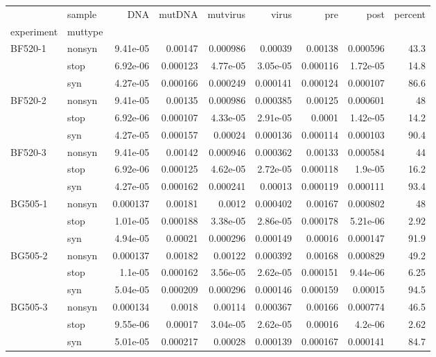 {\small
\begin{tabular}{llrrrrrrr}
\toprule
        & sample &      DNA &   mutDNA &  mutvirus &    virus &      pre &     post &  percent \\
experiment & muttype &          &          &           &          &          &          &          \\
\midrule
BF520-1 & nonsyn & 9.41e-05 &  0.00147 &  0.000986 &  0.00039 &  0.00138 & 0.000596 &     43.3 \\
        & stop & 6.92e-06 & 0.000123 &  4.77e-05 & 3.05e-05 & 0.000116 & 1.72e-05 &     14.8 \\
        & syn & 4.27e-05 & 0.000166 &  0.000249 & 0.000141 & 0.000124 & 0.000107 &     86.6 \\
BF520-2 & nonsyn & 9.41e-05 &  0.00135 &  0.000986 & 0.000385 &  0.00125 & 0.000601 &       48 \\
        & stop & 6.92e-06 & 0.000107 &  4.33e-05 & 2.91e-05 &   0.0001 & 1.42e-05 &     14.2 \\
        & syn & 4.27e-05 & 0.000157 &   0.00024 & 0.000136 & 0.000114 & 0.000103 &     90.4 \\
BF520-3 & nonsyn & 9.41e-05 &  0.00142 &  0.000946 & 0.000362 &  0.00133 & 0.000584 &       44 \\
        & stop & 6.92e-06 & 0.000125 &  4.62e-05 & 2.72e-05 & 0.000118 &  1.9e-05 &     16.2 \\
        & syn & 4.27e-05 & 0.000162 &  0.000241 &  0.00013 & 0.000119 & 0.000111 &     93.4 \\
BG505-1 & nonsyn & 0.000137 &  0.00181 &    0.0012 & 0.000402 &  0.00167 & 0.000802 &       48 \\
        & stop & 1.01e-05 & 0.000188 &  3.38e-05 & 2.86e-05 & 0.000178 & 5.21e-06 &     2.92 \\
        & syn & 4.94e-05 &  0.00021 &  0.000296 & 0.000149 &  0.00016 & 0.000147 &     91.9 \\
BG505-2 & nonsyn & 0.000137 &  0.00182 &   0.00122 & 0.000392 &  0.00168 & 0.000829 &     49.2 \\
        & stop &  1.1e-05 & 0.000162 &  3.56e-05 & 2.62e-05 & 0.000151 & 9.44e-06 &     6.25 \\
        & syn & 5.04e-05 & 0.000209 &  0.000296 & 0.000146 & 0.000159 &  0.00015 &     94.5 \\
BG505-3 & nonsyn & 0.000134 &   0.0018 &   0.00114 & 0.000367 &  0.00166 & 0.000774 &     46.5 \\
        & stop & 9.55e-06 &  0.00017 &  3.04e-05 & 2.62e-05 &  0.00016 &  4.2e-06 &     2.62 \\
        & syn & 5.01e-05 & 0.000217 &   0.00028 & 0.000139 & 0.000167 & 0.000141 &     84.7 \\
\bottomrule
\end{tabular}

}